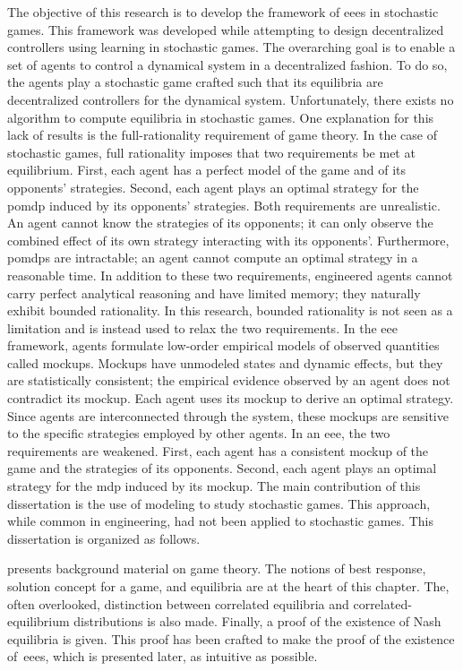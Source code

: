 The objective of this research is to develop the framework of \acp{eee} in stochastic games.
This framework was developed while attempting to design decentralized controllers using learning in stochastic games.
The overarching goal is to enable a set of agents to control a dynamical system in a decentralized fashion.
To do so, the agents play a stochastic game crafted such that its equilibria are decentralized controllers for the dynamical system.
Unfortunately, there exists no algorithm to compute equilibria in stochastic games.
One explanation for this lack of results is the full-rationality requirement of game theory.
In the case of stochastic games, full rationality imposes that two requirements be met at equilibrium.
First, each agent has a perfect model of the game and of its opponents' strategies.
Second, each agent plays an optimal strategy for the \ac{pomdp} induced by its opponents' strategies.
Both requirements are unrealistic.
An agent cannot know the strategies of its opponents; it can only observe the combined effect of its own strategy interacting with its opponents'.
Furthermore, \acp{pomdp} are intractable; an agent cannot compute an optimal strategy in a reasonable time.
In addition to these two requirements, engineered agents cannot carry perfect analytical reasoning and have limited memory; they naturally exhibit bounded rationality.
In this research, bounded rationality is not seen as a limitation and is instead used to relax the two requirements.
In the \ac{eee} framework, agents formulate low-order empirical models of observed quantities called mockups.
Mockups have unmodeled states and dynamic effects, but they are statistically consistent; the empirical evidence observed by an agent does not contradict its mockup.
Each agent uses its mockup to derive an optimal strategy.
Since agents are interconnected through the system, these mockups are sensitive to the specific strategies employed by other agents.
In an \ac{eee}, the two requirements are weakened.
First, each agent has a consistent mockup of the game and the strategies of its opponents.
Second, each agent plays an optimal strategy for the \ac{mdp} induced by its mockup.
The main contribution of this dissertation is the use of modeling to study stochastic games.
This approach, while common in engineering, had not been applied to stochastic games.
This dissertation is organized as follows.

 presents background material on game theory.
The notions of best response, solution concept for a game, and equilibria are at the heart of this chapter.
The, often overlooked, distinction between correlated equilibria and correlated-equilibrium distributions is also made.
Finally, a proof of the existence of Nash equilibria is given.
This proof has been crafted to make the proof of the existence of~\acp{eee}, which is presented later, as intuitive as possible.

